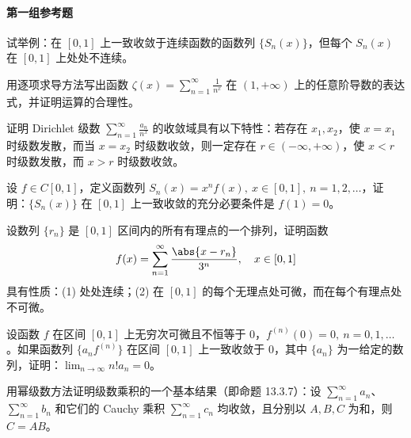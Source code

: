 \paragraph{第一组参考题}

\begin{xreferenceproblem}[1]
试举例：在 $[0,1]$ 上一致收敛于连续函数的函数列 $\{S_n(x)\}$，但每个 $S_n(x)$ 在 $[0,1]$ 上处处不连续。
\end{xreferenceproblem}

\begin{xreferenceproblem}[2]
用逐项求导方法写出函数 $\displaystyle\zeta(x)=\sum_{n=1}^{\infty}\frac1{n^x}$ 在 $(1,+\infty)$ 上的任意阶导数的表达式，并证明运算的合理性。
\end{xreferenceproblem}

\begin{xreferenceproblem}[3]
证明 Dirichlet 级数 $\displaystyle\sum_{n=1}^{\infty}\frac{a_n}{n^x}$ 的收敛域具有以下特性：若存在 $x_1,x_2$，使 $x=x_1$ 时级数发散，而当 $x=x_2$ 时级数收敛，则一定存在 $r\in(-\infty,+\infty)$，使 $x<r$ 时级数发散，而 $x>r$ 时级数收敛。
\end{xreferenceproblem}

\begin{xreferenceproblem}[4]
设 $f\in C[0,1]$，定义函数列 $S_n(x)=x^nf(x),\ x\in[0,1],\ n=1,2,\ldots$，证明：$\{S_n(x)\}$ 在 $[0,1]$ 上一致收敛的充分必要条件是 $f(1)=0$。
\end{xreferenceproblem}

\begin{xreferenceproblem}[5]
设数列 $\{r_n\}$ 是 $[0,1]$ 区间内的所有有理点的一个排列，证明函数
  \[
    f(x)=\sum_{n=1}^{\infty}\frac{\abs{x-r_n}}{3^n},\quad x\in[0,1]
  \]
  具有性质：(1) 处处连续；(2) 在 $[0,1]$ 的每个无理点处可微，而在每个有理点处不可微。
\end{xreferenceproblem}

\begin{xreferenceproblem}[6]
设函数 $f$ 在区间 $[0,1]$ 上无穷次可微且不恒等于 $0$，$f^{(n)}(0)=0,\ n=0,1,\ldots$。如果函数列 $\{a_nf^{(n)}\}$ 在区间 $[0,1]$ 上一致收敛于 $0$，其中 $\{a_n\}$ 为一给定的数列，证明：$\displaystyle\lim_{n\to\infty}n!a_n=0$。
\end{xreferenceproblem}

\begin{xreferenceproblem}[7]
用幂级数方法证明级数乘积的一个基本结果（即命题 13.3.7）：设 $\displaystyle\sum_{n=1}^{\infty}a_n$、$\displaystyle\sum_{n=1}^{\infty}b_n$ 和它们的 Cauchy 乘积 $\displaystyle\sum_{n=1}^{\infty}c_n$ 均收敛，且分别以 $A,B,C$ 为和，则 $C=AB$。
\end{xreferenceproblem}

